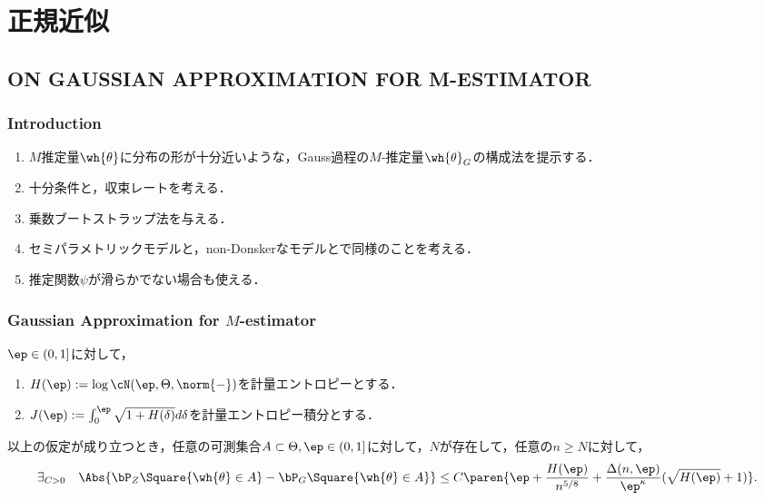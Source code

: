 \documentclass[uplatex,dvipdfmx]{jsreport}
\begin{document}
\chapter{正規近似}

\section{ON GAUSSIAN APPROXIMATION FOR M-ESTIMATOR}

\subsection{Introduction}

\begin{tcolorbox}[colframe=ForestGreen, colback=ForestGreen!10!white,breakable,colbacktitle=ForestGreen!40!white,coltitle=black,fonttitle=\bfseries\sffamily,
title=]
    \begin{enumerate}
        \item $M$推定量$\wh{\theta}$に分布の形が十分近いような，Gauss過程の$M$-推定量$\wh{\theta}_G$の構成法を提示する．
        \item 十分条件と，収束レートを考える．
        \item 乗数ブートストラップ法を与える．
        \item セミパラメトリックモデルと，non-Donskerなモデルとで同様のことを考える．
        \item 推定関数$\psi$が滑らかでない場合も使える．
    \end{enumerate}
\end{tcolorbox}

\subsection{Gaussian Approximation for $M$-estimator}

\begin{notation}
    $\ep\in(0,1]$に対して，
    \begin{enumerate}
        \item $H(\ep):=\log\cN(\ep,\Theta,\norm{-})$を計量エントロピーとする．
        \item $J(\ep):=\int^\ep_0\sqrt{1+H(\delta)}d\delta$を計量エントロピー積分とする．
    \end{enumerate}
\end{notation}

\begin{theorem}
    以上の仮定が成り立つとき，任意の可測集合$A\subset\Theta,\ep\in(0,1]$に対して，$N$が存在して，任意の$n\ge N$に対して，
    \[\exists_{C>0}\quad \Abs{\bP_Z\Square{\wh{\theta}\in A}-\bP_G\Square{\wh{\theta}\in A}}\le C\paren{\ep+\frac{H(\ep)}{n^{5/8}}+\frac{\Delta(n,\ep)}{\ep^\kappa}(\sqrt{H(\ep)}+1)}.\]
\end{theorem}
\end{document}
